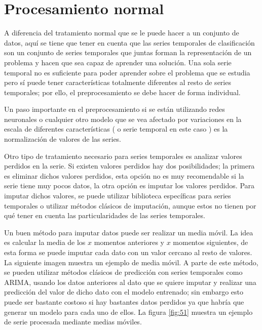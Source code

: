 \section{Procesamiento normal}
A diferencia del tratamiento normal que se le puede hacer a  un conjunto de datos, aquí se tiene que tener en cuenta que las series temporales de clasificación son un conjunto de series temporales que juntas forman la representación de un problema y hacen que sea capaz de aprender una solución. Una sola serie temporal no es suficiente para poder aprender sobre el problema que se estudia pero sí puede tener características totalmente diferentes al resto de series temporales; por ello, el preprocesamiento se debe hacer de forma individual.\newline

Un paso importante en el preprocesamiento si se están utilizando redes neuronales o cualquier otro modelo que se vea afectado por variaciones en la escala de diferentes características ( o serie temporal en este caso ) es la normalización de valores de las series.\newline

Otro tipo de tratamiento necesario para series temporales es analizar valores perdidos en la serie. Si existen valores perdidos hay dos posibilidades; la primera es eliminar dichos valores perdidos, esta opción no es muy recomendable si la serie tiene muy pocos datos, la otra opción es imputar los valores perdidos. Para imputar dichos valores, se puede utilizar biblioteca específicas para series temporales o utilizar métodos clásicos de imputación, aunque estos no tienen por qué tener en cuenta las particularidades de las series temporales.\newline

Un buen método para imputar datos puede ser realizar un media móvil. La idea es calcular la media de los $x$ momentos anteriores y $x$ momentos siguientes, de esta forma se puede imputar cada dato con un valor cercano al resto de valores. La siguiente imagen muestra un ejemplo de media móvil. A parte de este método, se pueden utilizar métodos clásicos de predicción con series temporales como ARIMA, usando los datos anteriores al dato que se quiere imputar y realizar una predicción del valor de dicho dato con el modelo entrenado; sin embargo esto puede ser bastante costoso si hay bastantes datos perdidos ya que habría que generar un modelo para cada uno de ellos. La figura \ref{fig:51} muestra un ejemplo de serie procesada mediante medias móviles.\newline

